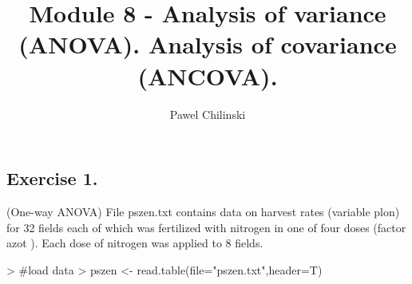 \documentclass[a4paper]{article}
\title{Module 8 - Analysis of variance (ANOVA). Analysis of covariance (ANCOVA).}
\author{Pawel Chilinski}
\begin{document}

\maketitle

\subsection{Exercise 1.} (One-way ANOVA) File pszen.txt contains data on harvest
rates (variable plon) for 32 fields each of which was fertilized with nitrogen in one of four
doses (factor azot ). Each dose of nitrogen was applied to 8 fields.
\begin{Schunk}
\begin{Sinput}
> #load data
> pszen <- read.table(file="pszen.txt",header=T)
\end{Sinput}
\end{Schunk}
\end{document}
